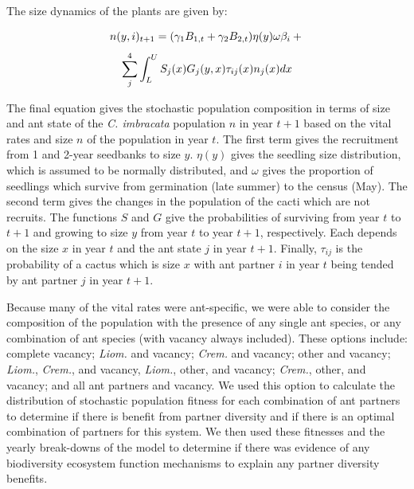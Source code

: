 \documentclass[12pt,a4paper]{article}
\begin{document}
{{The size dynamics of the plants are given by:

$$
n(y,i)_{t+1} = (\gamma_1 B_{1,t} + \gamma_2 B_{2,t}) \eta(y) \omega \beta_i  + \\
$$
$$
\sum_{j}^{4} \int_L^U S_j(x) G_j(y,x) \tau_{ij}(x) n_j(x) dx \\
$$

The final equation gives the stochastic population composition in terms of size and ant state of the \textit{C. imbracata} population $n$ in year $t+1$ based on the vital rates and size $n$ of the population in year $t$.
The first term gives the recruitment from 1 and 2-year seedbanks to size $y$.
$\eta(y)$ gives the seedling size distribution, which is assumed to be normally distributed, and $\omega$ gives the proportion of seedlings which survive from germination (late summer) to the census (May). 
The second term gives the changes in the population of the cacti which are not recruits. 
The functions $S$ and $G$ give the probabilities of surviving from year $t$ to $t+1$ and growing to size $y$ from year $t$ to year $t+1$, respectively. 
Each depends on the size $x$ in year $t$ and the ant state $j$ in year $t+1$. 
Finally, $\tau_{ij}$ is the probability of a cactus which is size $x$ with ant partner $i$ in year $t$ being tended by ant partner $j$ in year $t+1$. 

Because many of the vital rates were ant-specific, we were able to consider the composition of the population with the presence of any single ant species, or any combination of ant species (with vacancy always included).
These options include: complete vacancy; \textit{Liom.} and vacancy; \textit{Crem.} and vacancy; other and vacancy; \textit{Liom.}, \textit{Crem.}, and vacancy, \textit{Liom.}, other, and vacancy; \textit{Crem.}, other, and vacancy; and all ant partners and vacancy.
We used this option to calculate the distribution of stochastic population fitness for each combination of ant partners to determine if there is benefit from partner diversity and if there is an optimal combination of partners for this system. 
We then used these fitnesses and the yearly break-downs of the model to determine if there was evidence of any biodiversity ecosystem function mechanisms to explain any partner diversity benefits. 

}}
\end{document}
